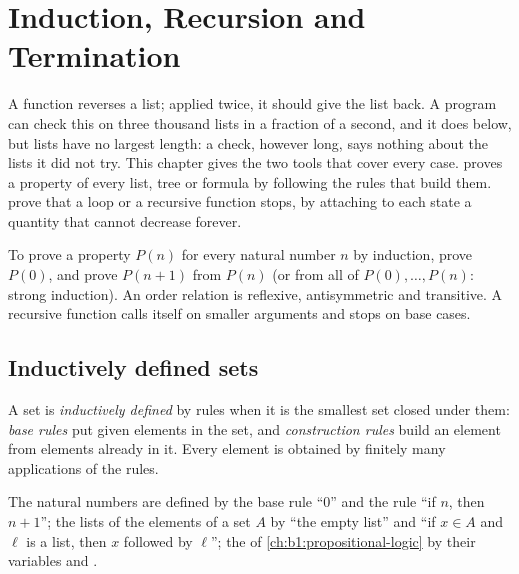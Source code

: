 \chapter{Induction, Recursion and Termination}\label{ch:b1:induction-and-termination}

A function reverses a list; applied twice, it should give the list back. A program can check this on three thousand
lists in a fraction of a second, and it does below, but lists have no largest length: a check, however long, says
nothing about the lists it did not try. This chapter gives the two tools that cover every case. 
proves a property of every list, tree or formula by following the rules that build them.  prove
that a loop or a recursive function stops, by attaching to each state a quantity that cannot decrease forever.

\begin{recall}
To prove a property $P(n)$ for every natural number $n$ by induction, prove $P(0)$, and prove $P(n + 1)$ from $P(n)$
(or from all of $P(0), \dots, P(n)$: strong induction). An order relation is reflexive, antisymmetric and transitive.
A recursive function calls itself on smaller arguments and stops on base cases.
\end{recall}

\section{Inductively defined sets}\label{sec:b1:induction-and-termination:sets}

\begin{definition}\label{def:b1:induction-and-termination:inductive}
A set is \emph{inductively defined} by rules when it is the smallest set closed under
them: \emph{base rules} put given elements in the set, and \emph{construction rules} build an element from elements
already in it. Every element is obtained by finitely many applications of the rules.
\end{definition}

The natural numbers are defined by the base rule ``0'' and the rule ``if $n$, then $n + 1$''; the lists of the
elements of a set $A$ by ``the empty list'' and ``if $x \in A$ and $\ell$ is a list, then $x$ followed by $\ell$'';
the  of \cref{ch:b1:propositional-logic} by their variables and .

